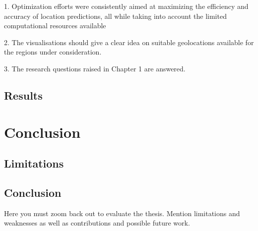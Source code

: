 \documentclass[a4paper,12pt]{Classes/RoboticsLaTeX}
\begin{document}
	1. Optimization efforts were consistently aimed at maximizing the efficiency and accuracy of location predictions,
	all while taking into account the limited computational resources available

	2. The visualisations should give a clear idea on suitable geolocations available for the regions under consideration.

	3. The research questions raised in Chapter 1 are answered.

	

	\section{Results}

	\chapter{Conclusion}
	\label{chap:conclusion}
	\section{Limitations}
	\section{Conclusion}

	
	Here you must zoom back out to evaluate the thesis. Mention limitations and weaknesses as well as contributions and possible future work.
	
	 
	\renewcommand{\bibname}{References}           %
	
	
	
	
\end{document}
